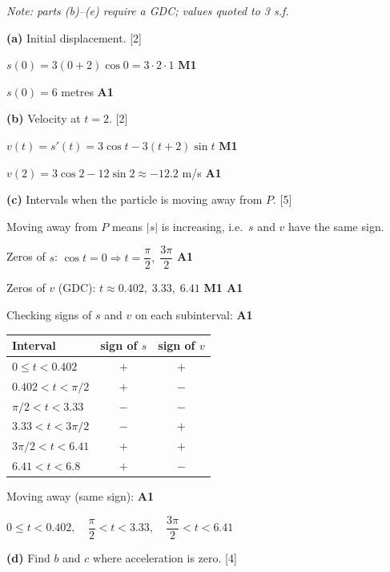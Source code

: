 \documentclass[12pt, twoside]{article}
\begin{document}
\begin{enumerate}[itemsep=0.3cm]
\medskip

\emph{Note: parts (b)--(e) require a GDC; values quoted to 3 s.f.}

\smallskip

\textbf{(a)} Initial displacement. \hfill [2]

$s(0) = 3(0 + 2)\cos 0 = 3 \cdot 2 \cdot 1$ \hfill \textbf{M1}

$s(0) = 6$ metres \hfill \textbf{A1}

\medskip

\textbf{(b)} Velocity at $t = 2$. \hfill [2]

$v(t) = s'(t) = 3\cos t - 3(t + 2)\sin t$ \hfill \textbf{M1}

$v(2) = 3\cos 2 - 12\sin 2 \approx -12.2$ m/s \hfill \textbf{A1}

\medskip

\textbf{(c)} Intervals when the particle is moving away from $P$. \hfill [5]

Moving away from $P$ means $|s|$ is increasing, i.e.\ $s$ and $v$
have the same sign.

Zeros of $s$: $\cos t = 0 \Rightarrow t = \dfrac{\pi}{2},\;
\dfrac{3\pi}{2}$ \hfill \textbf{A1}

Zeros of $v$ (GDC): $t \approx 0.402,\; 3.33,\; 6.41$ \hfill \textbf{M1 A1}

Checking signs of $s$ and $v$ on each subinterval: \hfill \textbf{A1}

\begin{center}
\begin{tabular}{lcc}
Interval & sign of $s$ & sign of $v$ \\ \hline
$0 \leq t < 0.402$ & $+$ & $+$ \\
$0.402 < t < \pi/2$ & $+$ & $-$ \\
$\pi/2 < t < 3.33$ & $-$ & $-$ \\
$3.33 < t < 3\pi/2$ & $-$ & $+$ \\
$3\pi/2 < t < 6.41$ & $+$ & $+$ \\
$6.41 < t < 6.8$ & $+$ & $-$ \\
\end{tabular}
\end{center}

Moving away (same sign): \hfill \textbf{A1}

$0 \leq t < 0.402,\quad \dfrac{\pi}{2} < t < 3.33,\quad
\dfrac{3\pi}{2} < t < 6.41$

\medskip

\textbf{(d)} Find $b$ and $c$ where acceleration is zero. \hfill [4]


\end{enumerate}
\end{document}
